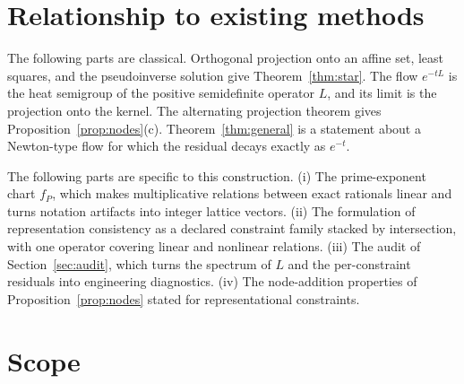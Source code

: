 \documentclass[11pt,letterpaper]{article}
\theoremstyle{plain}
\theoremstyle{definition}
\theoremstyle{remark}
\newcommand{\fP}{f_{P}}
\begin{document}
\section{Relationship to existing methods}\label{sec:related}

The following parts are classical. Orthogonal projection onto an affine set, least squares, and the pseudoinverse solution \cite{penrose,benisrael} give Theorem~\ref{thm:star}. The flow $e^{-tL}$ is the heat semigroup of the positive semidefinite operator $L$, and its limit is the projection onto the kernel. The alternating projection theorem \cite{vonneumann,halperin} gives Proposition~\ref{prop:nodes}(c). Theorem~\ref{thm:general} is a statement about a Newton-type flow \cite{nocedal} for which the residual decays exactly as $e^{-t}$.

The following parts are specific to this construction. (i) The prime-exponent chart $\fP$, which makes multiplicative relations between exact rationals linear and turns notation artifacts into integer lattice vectors. (ii) The formulation of representation consistency as a declared constraint family stacked by intersection, with one operator covering linear and nonlinear relations. (iii) The audit of Section~\ref{sec:audit}, which turns the spectrum of $L$ and the per-constraint residuals into engineering diagnostics. (iv) The node-addition properties of Proposition~\ref{prop:nodes} stated for representational constraints.

\section{Scope}
\end{document}
